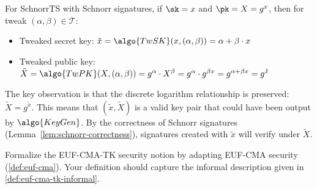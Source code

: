 \ifsolutions
\begin{mysolution}
  For SchnorrTS with Schnorr signatures, if $\sk = x$ and $\pk = X = g^x$, then for tweak $(\alpha, \beta) \in \mathcal{T}$:
  \begin{itemize}
    \item Tweaked secret key: $\tilde{x} = \algo{TwSK}(x, (\alpha, \beta)) = \alpha + \beta \cdot x$
    \item Tweaked public key: $\tilde{X} = \algo{TwPK}(X, (\alpha, \beta)) = g^\alpha \cdot X^\beta = g^\alpha \cdot g^{\beta x} = g^{\alpha + \beta x} = g^{\tilde{x}}$
  \end{itemize}
  
  The key observation is that the discrete logarithm relationship is preserved: $\tilde{X} = g^{\tilde{x}}$.
  This means that $(\tilde{x}, \tilde{X})$ is a valid key pair that could have been output by $\algo{KeyGen}$.
  By the correctness of Schnorr signatures (Lemma~\ref{lem:schnorr-correctness}), signatures created with $\tilde{x}$ will verify under $\tilde{X}$.
\end{mysolution}
\fi

\begin{exercise}\label{ex:euf-cma-tk-def}
  Formalize the EUF-CMA-TK security notion by adapting EUF-CMA security (\autoref{def:euf-cma}).
  Your definition should capture the informal description given in \autoref{def:euf-cma-tk-informal}.
\end{exercise}

